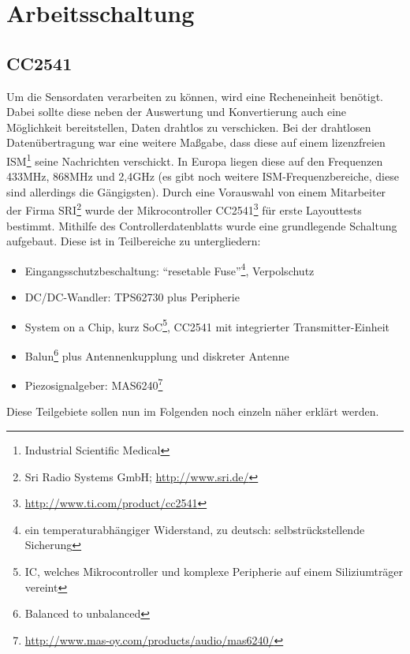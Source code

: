 \documentclass[12pt]{scrreprt} %
\begin{document}
\section{Arbeitsschaltung}
\subsection{CC2541}
\label{CC2541}
Um die Sensordaten verarbeiten zu können, wird eine Recheneinheit benötigt. Dabei sollte diese neben der Auswertung und Konvertierung auch eine Möglichkeit bereitstellen, Daten drahtlos zu verschicken. Bei der drahtlosen Datenübertragung war eine weitere Maßgabe, dass diese auf einem lizenzfreien ISM\footnote{Industrial Scientific Medical} seine Nachrichten verschickt. In Europa liegen diese auf den Frequenzen 433MHz, 868MHz und 2,4GHz (es gibt noch weitere ISM-Frequenzbereiche, diese sind allerdings die Gängigsten). Durch eine Vorauswahl von einem Mitarbeiter der Firma SRI\footnote{Sri Radio Systems GmbH; \url{http://www.sri.de/}} wurde der Mikrocontroller CC2541\footnote{\url{http://www.ti.com/product/cc2541}} für erste Layouttests bestimmt. Mithilfe des Controllerdatenblatts \citep{CC2541} wurde eine grundlegende Schaltung aufgebaut. Diese ist in Teilbereiche zu untergliedern:
\begin{itemize}
\item
Eingangsschutzbeschaltung:  "`resetable Fuse"'\footnote{ein temperaturabhängiger Widerstand, zu deutsch: selbstrückstellende Sicherung}, Verpolschutz
\item
DC/DC-Wandler: TPS62730 plus Peripherie
\item
System on a Chip, kurz SoC\footnote{IC, welches Mikrocontroller und komplexe Peripherie auf einem Siliziumträger vereint}, CC2541 mit integrierter Transmitter-Einheit
\item
Balun\footnote{Balanced to unbalanced} plus Antennenkupplung und diskreter Antenne
\item
Piezosignalgeber: MAS6240\footnote{\url{http://www.mas-oy.com/products/audio/mas6240/}} 
\end{itemize}
Diese Teilgebiete sollen nun im Folgenden noch einzeln näher erklärt werden.
\end{document}
